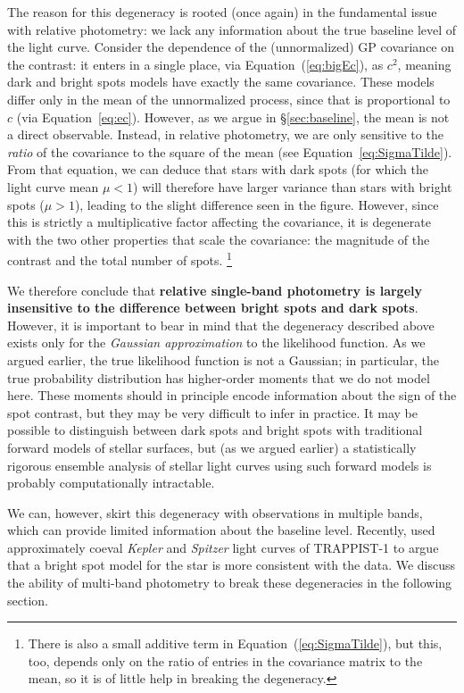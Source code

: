 \documentclass[modern]{aastex62}
\begin{document}
The reason for this degeneracy is rooted (once again) in the
fundamental issue with relative photometry: we lack any information about
the true baseline level of the light curve.
Consider the dependence of the (unnormalized) GP covariance on the
contrast: it enters in a single place, via Equation~(\ref{eq:bigEc}),
as $c^2$, meaning dark and bright spots models have exactly the same
covariance. These models differ only in the mean of the unnormalized
process, since that is proportional to $c$ (via Equation~\ref{eq:ec}).
However, as we argue in \S\ref{sec:baseline}, the mean is not a direct
observable. Instead, in relative photometry, we are only sensitive to
the \emph{ratio} of the covariance to the square of the mean
(see Equation~\ref{eq:SigmaTilde}). From that equation, we can deduce
that stars with dark spots (for which
the light curve mean $\mu < 1$) will therefore have larger variance
than stars with bright spots ($\mu > 1$), leading to the slight difference
seen in the figure. However, since this is strictly a multiplicative
factor affecting the covariance, it is degenerate with the two other
properties that scale the covariance: the magnitude of the contrast and
the total number of spots.%
\footnote{There is also a small additive term in
    Equation~(\ref{eq:SigmaTilde}), but this, too, depends only on the ratio
    of entries in the covariance matrix to the mean, so it is of little help
    in breaking the degeneracy.}

We therefore conclude that \textbf{relative single-band photometry is largely insensitive to
    the difference between bright spots and dark spots}. However, it is
important to bear in mind that the
degeneracy described above exists only for the \emph{Gaussian approximation}
to the likelihood function. As we argued earlier, the true likelihood function
is not a Gaussian; in particular, the true probability distribution
has higher-order moments that we do not model here. These moments should
in principle encode information about the sign of the spot contrast, but they
may be very difficult to infer in practice. It may be possible to distinguish
between dark spots and bright spots with traditional forward models of stellar
surfaces, but (as we argued earlier) a statistically rigorous ensemble analysis
of stellar light curves using such forward models is probably computationally
intractable.

We can, however, skirt this degeneracy with observations in multiple bands,
which can provide limited information about the baseline level. Recently,
\citet{Morris2018} used approximately coeval \emph{Kepler} and \emph{Spitzer}
light curves of TRAPPIST-1 to argue that a bright spot model for the star
is more consistent with the data. We discuss the ability of multi-band
photometry to break these degeneracies in the following section.
\end{document}
